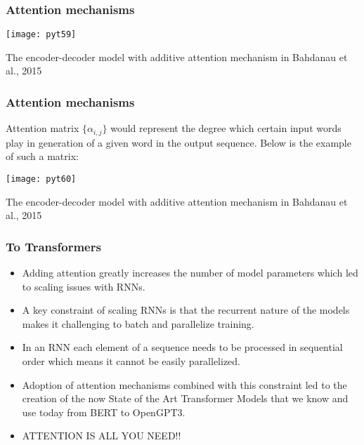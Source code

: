 \begin{frame}[fragile] \frametitle{Attention mechanisms}

\begin{center}
\texttt{[image: pyt59]}
\end{center}

{\tiny The encoder-decoder model with additive attention mechanism in Bahdanau et al., 2015}
\end{frame}

\begin{frame}[fragile] \frametitle{Attention mechanisms}

Attention matrix $\{\alpha_{i,j}\}$ would represent the degree which certain input words play in generation of a given word in the output sequence. Below is the example of such a matrix:


\begin{center}
\texttt{[image: pyt60]}
\end{center}

{\tiny The encoder-decoder model with additive attention mechanism in Bahdanau et al., 2015}
\end{frame}

\begin{frame}[fragile] \frametitle{To Transformers}


\begin{itemize}
\item Adding attention greatly increases the number of model parameters which led to scaling issues with RNNs. 
\item A key constraint of scaling RNNs is that the recurrent nature of the models makes it challenging to batch and parallelize training. 
\item In an RNN each element of a sequence needs to be processed in sequential order which means it cannot be easily parallelized.
\item Adoption of attention mechanisms combined with this constraint led to the creation of the now State of the Art Transformer Models that we know and use today from BERT to OpenGPT3.
\item ATTENTION IS ALL YOU NEED!!
\end{itemize}
\end{frame}

